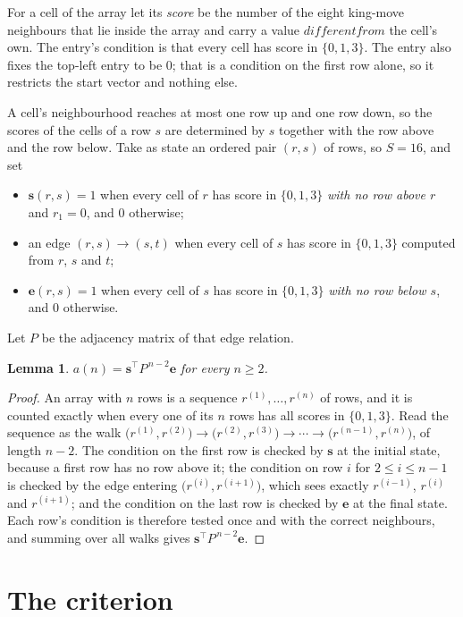 \documentclass[11pt,a4paper]{article}
\theoremstyle{plain}
\newtheorem{lemma}[theorem]{Lemma}
\theoremstyle{definition}
\begin{document}
For a cell of the array let its \emph{score} be the number of the eight king-move neighbours that lie inside
the array and carry a value $different from$ the cell's own. The entry's condition is that every cell
has score in $\{0,1,3\}$. The entry also fixes the top-left entry to be $0$; that is a condition on the first row alone, so it restricts the start vector and nothing else.

A cell's neighbourhood reaches at most one row up and one row down, so the scores of the
cells of a row $s$ are determined by $s$ together with the row above and the row below.
Take as state an ordered pair $(r,s)$ of rows, so $S=16$, and set
\begin{itemize}
\item $\mathbf{s}(r,s)=1$ when every cell of $r$ has score in $\{0,1,3\}$ \emph{with no row
above $r$} and $r_1=0$, and $0$ otherwise;
\item an edge $(r,s)\to(s,t)$ when every cell of $s$ has score in $\{0,1,3\}$ computed from
$r$, $s$ and $t$;
\item $\mathbf{e}(r,s)=1$ when every cell of $s$ has score in $\{0,1,3\}$ \emph{with no row
below $s$}, and $0$ otherwise.
\end{itemize}
Let $P$ be the adjacency matrix of that edge relation.

\begin{lemma}\label{lem:walk}
$a(n)=\mathbf{s}^{\!\top}P^{\,n-2}\mathbf{e}$ for every $n\ge2$.
\end{lemma}

\begin{proof}
An array with $n$ rows is a sequence $r^{(1)},\dots,r^{(n)}$ of rows, and it is counted
exactly when every one of its $n$ rows has all scores in $\{0,1,3\}$. Read the sequence as the
walk $\bigl(r^{(1)},r^{(2)}\bigr)\to\bigl(r^{(2)},r^{(3)}\bigr)\to\cdots\to
\bigl(r^{(n-1)},r^{(n)}\bigr)$, of length $n-2$. The condition on the first row is
checked by $\mathbf{s}$ at the initial state, because a first row has no row above it; the
condition on row $i$ for $2\le i\le n-1$ is checked by the edge entering
$\bigl(r^{(i)},r^{(i+1)}\bigr)$, which sees exactly $r^{(i-1)}$, $r^{(i)}$ and
$r^{(i+1)}$; and the condition on the last row is checked by $\mathbf{e}$ at the final
state. Each row's condition is therefore tested once and with the correct neighbours, and
summing over all walks gives $\mathbf{s}^{\!\top}P^{\,n-2}\mathbf{e}$.
\end{proof}

\section{The criterion}
\end{document}
